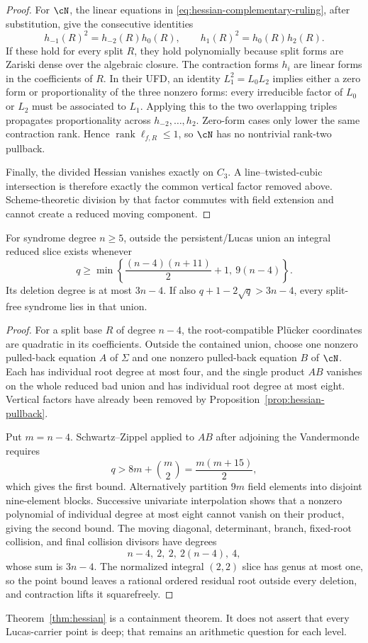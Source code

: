 \begin{proof}
For $\cN$, the linear equations in
\eqref{eq:hessian-complementary-ruling}, after substitution, give
the consecutive identities
\[
h_{-1}(R)^2=h_{-2}(R)h_0(R),\qquad
h_1(R)^2=h_0(R)h_2(R).
\]
If these hold for every split $R$, they hold polynomially because
split forms are Zariski dense over the algebraic closure.  The
contraction forms $h_i$ are linear forms in the coefficients of $R$.
In their UFD, an identity $L_1^2=L_0L_2$ implies either a zero form or
proportionality of the three nonzero forms: every irreducible factor
of $L_0$ or $L_2$ must be associated to $L_1$.  Applying this to the
two overlapping triples propagates proportionality across
$h_{-2},\ldots,h_2$.  Zero-form cases only lower the same contraction
rank.  Hence $\operatorname{rank}\ell_{f,R}\leq1$, so $\cN$ has no
nontrivial rank-two pullback.

Finally, the divided Hessian vanishes exactly on $C_3$.
A line--twisted-cubic intersection is therefore exactly the common
vertical factor removed above.  Scheme-theoretic division by that
factor commutes with field extension and cannot create a reduced
moving component.
\end{proof}

\begin{proposition}
\label{prop:hessian-effective}
For syndrome degree $n\geq5$, outside the persistent/Lucas union an
integral reduced slice exists whenever
\[
q\geq
\min\left\{\frac{(n-4)(n+11)}2+1,\ 9(n-4)\right\}.
\]
Its deletion degree is at most $3n-4$.  If also
$q+1-2\sqrt q>3n-4$, every split-free syndrome lies in that union.
\end{proposition}

\begin{proof}
For a split base $R$ of degree $n-4$, the root-compatible Pl\"ucker
coordinates are quadratic in its coefficients.  Outside the contained
union, choose one nonzero pulled-back equation $A$ of $\Sigma$ and one
nonzero pulled-back equation $B$ of $\cN$.  Each has individual
root degree at most four, and the single product $AB$ vanishes on the
whole reduced bad union and has individual root degree at most eight.
Vertical factors have already been removed by
Proposition~\ref{prop:hessian-pullback}.

Put $m=n-4$.  Schwartz--Zippel applied to $AB$ after adjoining the
Vandermonde requires
\[
q>8m+\binom m2=\frac{m(m+15)}2,
\]
which gives the first bound.  Alternatively partition $9m$ field
elements into disjoint nine-element blocks.  Successive univariate
interpolation shows that a nonzero polynomial of individual degree at
most eight cannot vanish on their product, giving the second bound.
The moving diagonal, determinant, branch, fixed-root collision, and
final collision divisors have degrees
\[
       n-4,\ 2,\ 2,\ 2(n-4),\ 4,
\]
whose sum is $3n-4$.  The normalized integral $(2,2)$ slice has genus at
most one, so the point bound leaves a rational ordered residual root
outside every deletion, and contraction lifts it squarefreely.
\end{proof}

Theorem~\ref{thm:hessian} is a containment theorem.  It does not assert
that every Lucas-carrier point is deep; that remains an arithmetic
question for each level.
